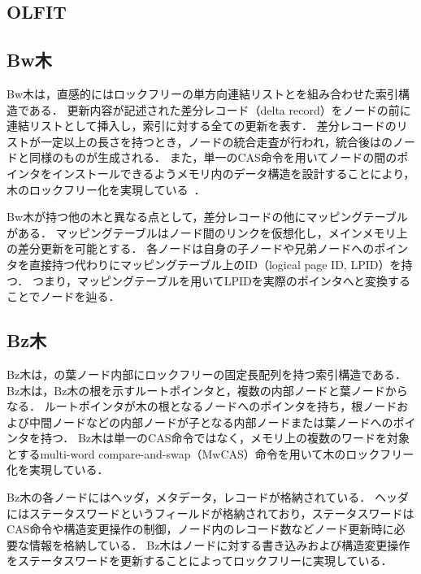 \subsection{\Blinktree{}}


\subsection{OLFIT}


\subsection{Bw木}

Bw木は，直感的にはロックフリーの単方向連結リストと\Bptree{}を組み合わせた索引構造である．
更新内容が記述された差分レコード（delta record）をノードの前に連結リストとして挿入し，索引に対する全ての更新を表す．
差分レコードのリストが一定以上の長さを持つとき，ノードの統合走査が行われ，統合後は\Bptree{}のノードと同様のものが生成される．
また，単一のCAS命令を用いてノードの間のポインタをインストールできるようメモリ内のデータ構造を設計することにより，木のロックフリー化を実現している~\cite{book:DatabaseInternals}．

Bw木が持つ他の木と異なる点として，差分レコードの他にマッピングテーブルがある．
マッピングテーブルはノード間のリンクを仮想化し，メインメモリ上の差分更新を可能とする．
各ノードは自身の子ノードや兄弟ノードへのポインタを直接持つ代わりにマッピングテーブル上のID（logical page ID, LPID）を持つ．
つまり，マッピングテーブルを用いてLPIDを実際のポインタへと変換することでノードを辿る．

\subsection{Bz木}

Bz木は，\Bptree{}の葉ノード内部にロックフリーの固定長配列を持つ索引構造である．
Bz木は，Bz木の根を示すルートポインタと，複数の内部ノードと葉ノードからなる．
ルートポインタが木の根となるノードへのポインタを持ち，根ノードおよび中間ノードなどの内部ノードが子となる内部ノードまたは葉ノードへのポインタを持つ．
Bz木は単一のCAS命令ではなく，メモリ上の複数のワードを対象とするmulti-word compare-and-swap（MwCAS）命令を用いて木のロックフリー化を実現している．

Bz木の各ノードにはヘッダ，メタデータ，レコードが格納されている．
ヘッダにはステータスワードというフィールドが格納されており，ステータスワードはCAS命令や構造変更操作の制御，ノード内のレコード数などノード更新時に必要な情報を格納している．
Bz木はノードに対する書き込みおよび構造変更操作をステータスワードを更新することによってロックフリーに実現している．

